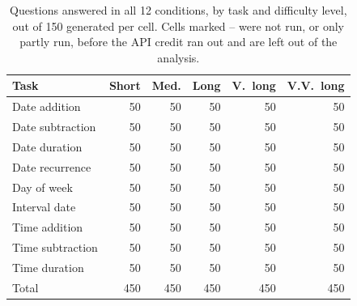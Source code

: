 \begin{table}[t]
\centering
\small
\setlength{\tabcolsep}{3.5pt}
\begin{tabular}{@{}lrrrrr@{}}
\toprule
Task & Short & Med. & Long & V.\ long & V.V.\ long \\
\midrule
Date addition & 50 & 50 & 50 & 50 & 50 \\
Date subtraction & 50 & 50 & 50 & 50 & 50 \\
Date duration & 50 & 50 & 50 & 50 & 50 \\
Date recurrence & 50 & 50 & 50 & 50 & 50 \\
Day of week & 50 & 50 & 50 & 50 & 50 \\
Interval date & 50 & 50 & 50 & 50 & 50 \\
Time addition & 50 & 50 & 50 & 50 & 50 \\
Time subtraction & 50 & 50 & 50 & 50 & 50 \\
Time duration & 50 & 50 & 50 & 50 & 50 \\
\midrule
Total & 450 & 450 & 450 & 450 & 450 \\
\bottomrule
\end{tabular}
\caption{Questions answered in all 12 conditions, by task and difficulty level, out of 150 generated per cell. Cells marked -- were not run, or only partly run, before the API credit ran out and are left out of the analysis.}
\label{tab:coverage}
\end{table}
